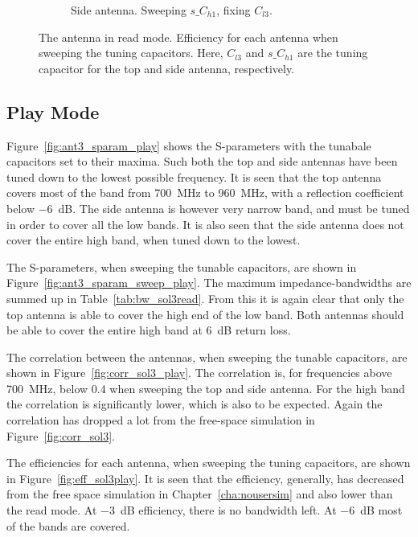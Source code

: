 \begin{figure}[htbp]
\begin{subfigure}{0.49\linewidth}
        \caption{Side antenna. Sweeping $s\_C_{h1}$, fixing $C_{l3}$.}
    \end{subfigure}
    \caption{The antenna in read mode. Efficiency for each antenna when sweeping the tuning capacitors. Here, $C_{l3}$ and $s\_C_{h1}$ are the tuning capacitor for the top and side antenna, respectively.}
    \label{fig:eff_sol3read}
\end{figure}


\FloatBarrier
\subsection{Play Mode}
Figure~\ref{fig:ant3_sparam_play} shows the S-parameters with the tunabale capacitors set to their maxima. Such both the top and side antennas have been tuned down to the lowest possible frequency. It is seen that the top antenna covers most of the band from \SI{700}{MHz} to \SI{960}{MHz}, with a reflection coefficient below \SI{-6}{dB}. The side antenna is however very narrow band, and must be tuned in order to cover all the low bands. It is also seen that the side antenna does not cover the entire high band, when tuned down to the lowest. 

The S-parameters, when sweeping the tunable capacitors, are shown in Figure~\ref{fig:ant3_sparam_sweep_play}. The maximum impedance-bandwidths are summed up in Table~\ref{tab:bw_sol3read}. From this it is again clear that only the top antenna is able to cover the high end of the low band. Both antennas should be able to cover the entire high band at \SI{6}{dB} return loss.

The correlation between the antennas, when sweeping the tunable capacitors, are shown in Figure~\ref{fig:corr_sol3_play}. The correlation is, for frequencies above \SI{700}{MHz}, below 0.4 when sweeping the top and side antenna. For the high band the correlation is significantly lower, which is also to be expected. Again the correlation has dropped a lot from the free-space simulation in Figure~\ref{fig:corr_sol3}.

The efficiencies for each antenna, when sweeping the tuning capacitors, are shown in Figure~\ref{fig:eff_sol3play}. It is seen that the efficiency, generally, has decreased from the free space simulation in Chapter~\ref{cha:nousersim} and also lower than the read mode. At \SI{-3}{dB} efficiency, there is no bandwidth left. At \SI{-6}{dB} most of the bands are covered.


